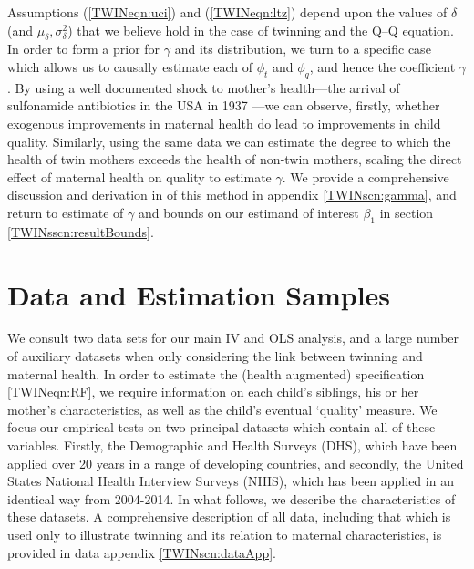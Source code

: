 \documentclass[subeqn]{article}
\begin{document}
\begin{spacing}{1.4}
Assumptions (\ref{TWINeqn:uci}) and (\ref{TWINeqn:ltz}) depend upon the values
of $\delta$ (and $\mu_\delta,\sigma^2_\delta$) that we believe hold in the case 
of twinning and the Q--Q equation.  In order to form a prior for $\gamma$ and its
distribution, we turn to a specific case which allows us to causally estimate 
each of $\phi_t$ and $\phi_q$, and hence the coefficient $\gamma$.  By using a 
well documented shock to mother's health---the arrival of sulfonamide antibiotics 
in the USA in 1937 \citep{BhalotraVenkataramani2014,Jayachandranetal2010}---we 
can observe, firstly, whether exogenous improvements in maternal health do lead
to improvements in child quality.  Similarly, using the same data we can estimate
the degree to which the health of twin mothers exceeds the health of non-twin 
mothers, scaling the direct effect of maternal health on quality to estimate 
$\gamma$.  We provide a comprehensive discussion and derivation in of this method 
in appendix \ref{TWINscn:gamma}, and return to estimate of $\gamma$ and bounds on 
our estimand of interest $\beta_1$ in section \ref{TWINsscn:resultBounds}.


\section{Data and Estimation Samples}              \label{TWINscn:data}
We consult two data sets for our main IV and OLS analysis, and a large number of
auxiliary datasets when only considering the link between twinning and maternal
health.  In order to estimate the (health augmented) specification 
\ref{TWINeqn:RF}, we require information on each child's siblings, his or her
mother's characteristics, as well as the child's eventual `quality' measure. 
We focus our empirical tests on two principal datasets which contain all of 
these variables.  Firstly, the Demographic and Health Surveys (DHS), which have 
been applied over 20 years in a range of developing countries, and secondly, the 
United States National Health Interview Surveys (NHIS), which has been applied 
in an identical way from 2004-2014.  In what follows, we describe the 
characteristics of these datasets.  A comprehensive description of all data, 
including that which is used only to illustrate twinning and its relation to 
maternal characteristics, is provided in data appendix \ref{TWINscn:dataApp}.


\end{spacing}
\end{document}
